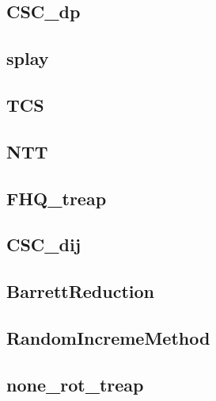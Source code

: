 \subsection{CSC\_dp}
\raggedbottom
\hrulefill

\subsection{splay}
\raggedbottom
\hrulefill

\subsection{TCS}
\raggedbottom
\hrulefill

\subsection{NTT}
\raggedbottom
\hrulefill

\subsection{FHQ\_treap}
\raggedbottom
\hrulefill

\subsection{CSC\_dij}
\raggedbottom
\hrulefill

\subsection{BarrettReduction}
\raggedbottom
\hrulefill

\subsection{RandomIncremeMethod}
\raggedbottom
\hrulefill

\subsection{none\_rot\_treap}
\raggedbottom
\hrulefill

